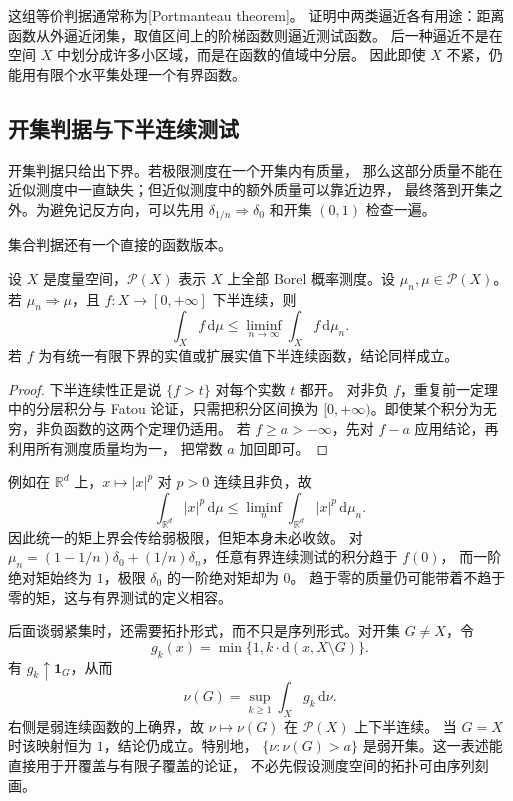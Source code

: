 这组等价判据通常称为[Portmanteau theorem]。
证明中两类逼近各有用途：距离函数从外逼近闭集，取值区间上的阶梯函数则逼近测试函数。
后一种逼近不是在空间 \(X\) 中划分成许多小区域，而是在函数的值域中分层。
因此即使 \(X\) 不紧，仍能用有限个水平集处理一个有界函数。

\subsection{开集判据与下半连续测试}
\label{b1:subsec:120202}

开集判据只给出下界。若极限测度在一个开集内有质量，
那么这部分质量不能在近似测度中一直缺失；但近似测度中的额外质量可以靠近边界，
最终落到开集之外。为避免记反方向，可以先用 \(\delta_{1/n}\Rightarrow\delta_0\)
和开集 \((0,1)\) 检查一遍。

\ProseParagraphBreak

集合判据还有一个直接的函数版本。

\begin{proposition}\label{b1:prop:weak-lower-semicontinuity}
设 \(X\) 是度量空间，\(\mathcal P(X)\) 表示 \(X\) 上全部 Borel 概率测度。设 \(\mu_n,\mu\in\mathcal P(X)\)。若 \(\mu_n\Rightarrow\mu\)，且 \(f:X\to[0,+\infty]\) 下半连续，则
\[
 \int_X f\,\mathrm{d}\mu\leq\liminf_{n\to\infty}\int_X f\,\mathrm{d}\mu_n.
\]
若 \(f\) 为有统一有限下界的实值或扩展实值下半连续函数，结论同样成立。
\end{proposition}
\begin{proof}
下半连续性正是说 \(\{f>t\}\) 对每个实数 \(t\) 都开。
对非负 \(f\)，重复前一定理中的分层积分与 Fatou 论证，只需把积分区间换为
\([0,+\infty)\)。即使某个积分为无穷，非负函数的这两个定理仍适用。
若 \(f\geq a> -\infty\)，先对 \(f-a\) 应用结论，再利用所有测度质量均为一，
把常数 \(a\) 加回即可。
\end{proof}

例如在 \(\mathbb R^d\) 上，\(x\mapsto|x|^p\) 对 \(p>0\) 连续且非负，故
\[
 \int_{\mathbb R^d}|x|^p\,\mathrm{d}\mu
 \leq\liminf_n\int_{\mathbb R^d}|x|^p\,\mathrm{d}\mu_n.
\]
因此统一的矩上界会传给弱极限，但矩本身未必收敛。
对 \(\mu_n=(1-1/n)\delta_0+(1/n)\delta_n\)，任意有界连续测试的积分趋于 \(f(0)\)，
而一阶绝对矩始终为 \(1\)，极限 \(\delta_0\) 的一阶绝对矩却为 \(0\)。
趋于零的质量仍可能带着不趋于零的矩，这与有界测试的定义相容。

\ProseParagraphBreak

后面谈弱紧集时，还需要拓扑形式，而不只是序列形式。对开集 \(G\ne X\)，令
\[
 g_k(x)=\min\{1,k\cdot \mathrm{d}(x,X\setminus G)\}.
\]
有 \(g_k\uparrow\mathbf1_G\)，从而
\[
 \nu(G)=\sup_{k\geq1}\int_X g_k\,\mathrm{d}\nu.
\]
右侧是弱连续函数的上确界，故 \(\nu\mapsto\nu(G)\) 在 \(\mathcal P(X)\) 上下半连续。
当 \(G=X\) 时该映射恒为 \(1\)，结论仍成立。特别地，
\(\{\nu:\nu(G)>a\}\) 是弱开集。这一表述能直接用于开覆盖与有限子覆盖的论证，
不必先假设测度空间的拓扑可由序列刻画。

